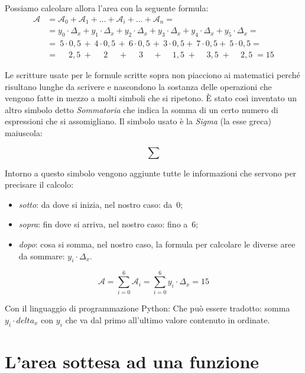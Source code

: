 Possiamo calcolare allora l'area con la seguente formula:
\begin{align*}
  \mathcal{A} &= \mathcal{A}_0 + \mathcal{A}_1 + \dots + 
                 \mathcal{A}_i + \dots + \mathcal{A}_n = \\
              &= y_0 \cdot \Delta_x + y_1 \cdot \Delta_x + 
                 y_2 \cdot \Delta_x + y_3 \cdot \Delta_x + 
                 y_4 \cdot \Delta_x + y_5 \cdot \Delta_x = \\
              &= ~5 \cdot 0,5\, + ~4 \cdot 0,5\, + ~6 \cdot 0,5\, + 
                 ~3 \cdot 0,5 + ~7 \cdot 0,5 + ~5 \cdot 0,5 = \\
              &= \quad\; 2,5 \; + \quad\; 2 \quad\; + \quad\; 3 \quad\, + 
                 \quad\, 1,5 \; + \quad\, 3,5 \; + \quad\, 2,5 \; = 15
\end{align*}

Le scritture usate per le formule scritte sopra non piacciono ai matematici 
perché risultano lunghe da scrivere e nascondono la sostanza delle operazioni 
che vengono fatte in mezzo a molti simboli che si ripetono. 
È stato così inventato un altro simbolo detto 
\emph{Sommatoria} che indica la somma di un certo numero di espressioni che 
si assomigliano. Il simbolo usato è la \emph{Sigma} (la esse greca) maiuscola:

\[\sum\]

Intorno a questo simbolo vengono aggiunte tutte le informazioni che servono 
per precisare il calcolo:

\begin{itemize} [nosep]
 \item \emph{sotto}: da dove si inizia, nel nostro caso: da~0;
 \item \emph{sopra}: fin dove si arriva, nel nostro caso: fino a~6;
 \item \emph{dopo}: cosa si somma, nel nostro caso, la formula per calcolare 
le diverse aree da sommare: \(y_i \cdot \Delta_x\).
\end{itemize}

\[\mathcal{A} = \sum_{i=0}^6 \mathcal{A}_i = 
                \sum_{i=0}^6 y_i \cdot \Delta_x = 15\]

\ifcoding
Con il linguaggio di programmazione Python:
Che può essere tradotto: somma \(y_i \cdot delta_x\) con \(y_i\) che va 
dal primo all'ultimo valore contenuto in ordinate.
\fi

\section{L'area sottesa ad una funzione}
\label{sec:integrali_definiti}

